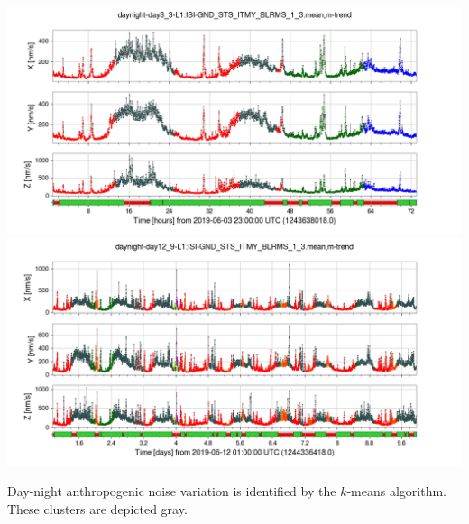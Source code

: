 \documentclass[colorlinks=true,pdfstartview=FitV,linkcolor=blue,
            citecolor=red,urlcolor=magenta]{ligodoc}
\begin{document}
\rightfigures
{
  \includegraphics[width=\textwidth]{assets/report1/daynight-day3_3-L1:ISI-GND_STS_ITMY_BLRMS_1_3mean,m-trend.png}\\
  \includegraphics[width=\textwidth]{assets/report1/daynight-day12_9-L1:ISI-GND_STS_ITMY_BLRMS_1_3mean,m-trend.png}
}{
  \caption{Day-night anthropogenic noise variation is identified by the $k$-means algorithm. These clusters are depicted gray.}
}
\end{document}
